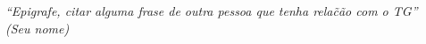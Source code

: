 \begin{epigrafe}
    \vspace*{\fill}
    \begin{flushright}
        \textit{“Epigrafe, citar alguma frase de outra pessoa que tenha rela\~c\~ao com o TG”\\
        (Seu nome)}
    \end{flushright}
\end{epigrafe}
